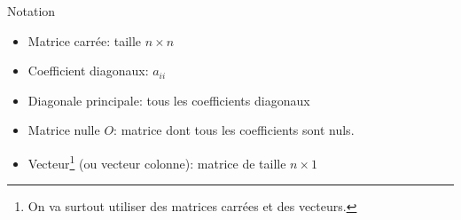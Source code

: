 \documentclass[french]{beamer}
\begin{document}
	\begin{frame}{}
		\begin{block}{Notation}
		\begin{itemize}
			\item Matrice carrée: taille $n \times n$
			\item Coefficient diagonaux: $a_{ii}$
			\item Diagonale principale: tous les coefficients diagonaux 
			\item Matrice nulle $O$: matrice dont tous les coefficients sont nuls.
			\item Vecteur\footnote{On va surtout utiliser des matrices carrées et des vecteurs.} (ou vecteur colonne): matrice de taille $n \times 1$
		\end{itemize}
		\end{block}		

	\end{frame}
\end{document}
